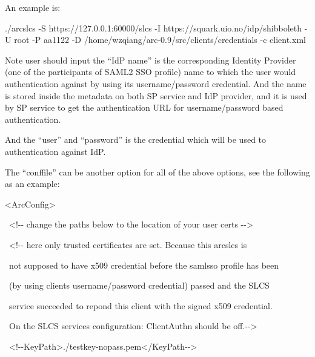 \documentclass{article}
\begin{document}
{\color{black}
An example is:}

{\color{black}
./arcslcs -S https://127.0.0.1:60000/slcs -I
https://squark.uio.no/idp/shibboleth -U root -P aa1122 -D
/home/wzqiang/arc-0.9/src/clients/credentials -c client.xml }

{\color{black}
Note user should input the {\textquotedblleft}IdP
name{\textquotedblright} is the corresponding Identity Provider (one of
the participants of SAML2 SSO profile) name to which the user would
authentication against by using its username/password credential. And
the name is stored inside the metadata on both SP service and IdP
provider, and it is used by SP service to get the authentication URL
for username/password based authentication.}

{\color{black}
And the {\textquotedblleft}user{\textquotedblright} and
{\textquotedblleft}password{\textquotedblright} is the credential which
will be used to authentication against IdP.}

{\color{black}
The {\textquotedblleft}conffile{\textquotedblright} can be another
option for all of the above options, see the following as an example:}

{\ttfamily\color{black}
{\textless}ArcConfig{\textgreater} }

{\ttfamily\color{black}
\ {\textless}!-{}- change the paths below to the location of your user
certs -{}-{\textgreater} }

{\ttfamily\color{black}
\ {\textless}!-{}- here only trusted certificates are set. Because this
arcslcs is }

{\ttfamily\color{black}
\ not supposed to have x509 credential before the samlsso profile has
been }

{\ttfamily\color{black}
\ (by using client{\textquotesingle}s username/password credential)
passed and the SLCS }

{\ttfamily\color{black}
\ service succeeded to repond this client with the signed x509
credential. }

{\ttfamily\color{black}
\ On the SLCS service{\textquotesingle}s configuration: ClientAuthn
should be off.-{}-{\textgreater} }

{\ttfamily\color{black}
\ {\textless}!-{}-KeyPath{\textgreater}./testkey-nopass.pem{\textless}/KeyPath-{}-{\textgreater}
}
\end{document}
